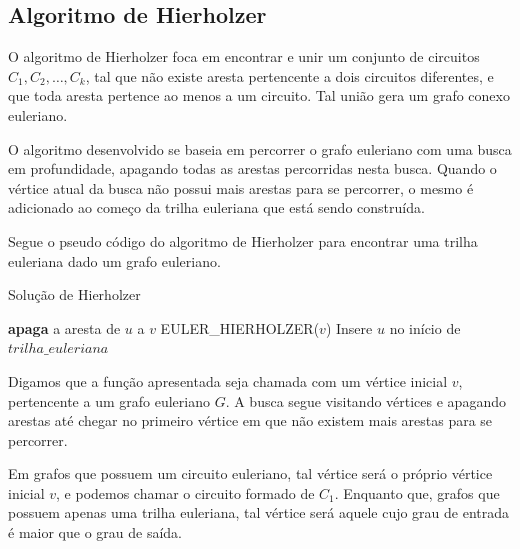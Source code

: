 

\subsection{Algoritmo de Hierholzer}

O algoritmo de Hierholzer foca em encontrar e unir um conjunto de circuitos $C_1, C_2, \dots, C_k$, tal que não existe aresta pertencente a dois circuitos diferentes, e que toda aresta pertence ao menos a um circuito.
Tal união gera um grafo conexo euleriano.

O algoritmo desenvolvido se baseia em percorrer o grafo euleriano com uma busca em profundidade, apagando todas as arestas percorridas nesta busca.
Quando o vértice atual da busca não possui mais arestas para se percorrer, o mesmo é adicionado ao começo da trilha euleriana que está sendo construída.

Segue o pseudo código do algoritmo de Hierholzer para encontrar uma trilha euleriana dado um grafo euleriano.

\begin{algorithm}
    \caption{Solução de Hierholzer}\label{eulerian-hierholzer}
    \begin{algorithmic}[1]
        \State \textbf{apaga} a aresta de $u$ a $v$
        \State EULER\_HIERHOLZER($v$)
    \EndFor
    \State Insere $u$ no início de $trilha\_euleriana$
    \EndFunction
    \end{algorithmic}
\end{algorithm}

Digamos que a função apresentada seja chamada com um vértice inicial $v$, pertencente a um grafo euleriano $G$. A busca segue visitando vértices e apagando arestas até chegar no primeiro vértice em que não existem mais arestas para se percorrer. 

Em grafos que possuem um circuito euleriano, tal vértice será o próprio vértice inicial $v$, e podemos chamar o circuito formado de $C_1$.
Enquanto que, grafos que possuem apenas uma trilha euleriana, tal vértice será aquele cujo grau de entrada é maior que o grau de saída.

